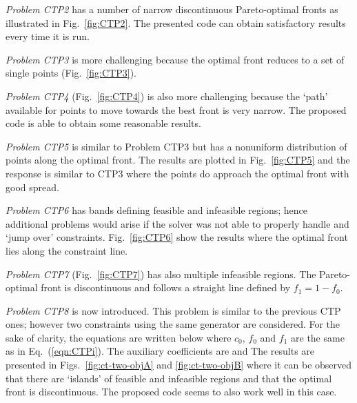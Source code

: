 \documentclass[final,5p,times,twocolumn]{elsarticle}
\newcommand{\figname} {Fig.}
\newcommand{\fignames}{Figs.}
\newcommand{\eqname}  {Eq.}
\begin{document}
\emph{Problem CTP2} has a number of narrow discontinuous Pareto-optimal fronts as illustrated in
\figname~\ref{fig:CTP2}. The presented code can obtain satisfactory results every time it is
run.

\emph{Problem CTP3} is more challenging because the optimal front reduces to a set of single points
(\figname~\ref{fig:CTP3}).

\emph{Problem CTP4} (\figname~\ref{fig:CTP4}) is also more challenging because the `path' available for
points to move towards the best front is very narrow. The proposed code is able to obtain some
reasonable results.

\emph{Problem CTP5} is similar to Problem CTP3 but has a nonuniform distribution of points along the
optimal front. The results are plotted in \figname~\ref{fig:CTP5} and the response is similar to
CTP3 where the points do approach the optimal front with good spread.

\emph{Problem CTP6} has bands defining feasible and infeasible regions; hence additional problems would
arise if the solver was not able to properly handle and `jump over' constraints.
\figname~\ref{fig:CTP6} show the results where the optimal front lies along the constraint
line.

\emph{Problem CTP7} (\figname~\ref{fig:CTP7}) has also multiple infeasible regions. The Pareto-optimal
front is discontinuous and follows a straight line defined by $f_1=1-f_0$.


\emph{Problem CTP8} \citep{deb:01a} is now introduced. This problem is similar to the previous CTP
ones; however two constraints using the same generator are considered. For the sake of clarity, the
equations are written below
\CTPeight
where $c_0$, $f_0$ and $f_1$ are the same as in \eqname~(\ref{eqn:CTPi}). The auxiliary coefficients are
\CTPeightC
and
\CTPeightCx
The results are presented in \fignames~\ref{fig:ct-two-objA} and \ref{fig:ct-two-objB} where it can
be observed that there are `islands' of feasible and infeasible regions and that the optimal front
is discontinuous. The proposed code seems to also work well in this case.
\end{document}

